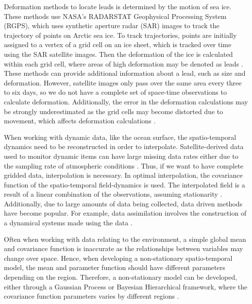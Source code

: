 \documentclass[12pt]{article}
\begin{document}
Deformation methods to locate leads is determined by the motion of sea
ice. These methods use NASA's RADARSTAT Geophysical Processing System
(RGPS), which uses synthetic aperture radar (SAR) images to track the
trajectory of points on Arctic sea ice. To track trajectories, points
are initially assigned to a vertex of a grid cell on an ice sheet, which
is tracked over time using the SAR satellite images. Then the
deformation of the ice is calculated within each grid cell, where areas
of high deformation may be denoted as leads
\citep{peterson_evaluating_2011}. These methods can provide additional
information about a lead, such as size and deformation. However,
satellite images only pass over the same area every three to six days,
so we do not have a complete set of space-time observations to calculate
deformation. Additionally, the error in the deformation calculations may
be strongly underestimated as the grid cells may become distorted due to
movement, which affects deformation calculations
\citep{bouillon_producing_2015}.

When working with dynamic data, like the ocean surface, the
spatio-temporal dynamics need to be reconstructed in order to
interpolate. Satellite-derived data used to monitor dynamic items can
have large missing data rates either due to the sampling rate of
atmospheric conditions \citep{fablet_data-driven_2017}. Thus, if we want
to have complete gridded data, interpolation is necessary. In optimal
interpolation, the covariance function of the spatio-temporal
field-dynamics is used. The interpolated field is a result of a linear
combination of the observations, assuming stationarity
\citep{fablet_data-driven_2017, ouala_neural_2018}. Additionally, due to
large amounts of data being collected, data driven methods have become
popular. For example, data assimilation involves the construction of a
dynamical systems made using the data
\citep{li_variational_2015, fablet_data-driven_2017, ouala_neural_2018}.

Often when working with data relating to the environment, a simple
global mean and covariance function is inaccurate as the relationships
between variables may change over space. Hence, when developing a
non-stationary spatio-temporal model, the mean and parameter function
should have different parameters depending on the region. Therefore, a
non-stationary model can be developed, either through a Gaussian Process
or Bayesian Hierarchical framework, where the covariance function
parameters varies by different regions
\citep{guinness_nonstationary_2013, SALVANA2020100411}.
\end{document}
